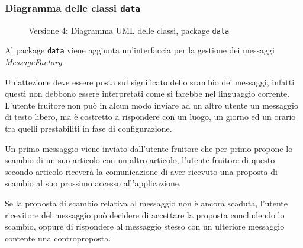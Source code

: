 \subsubsection{Diagramma delle classi \texttt{data}}
\vspace{0.5cm}
\begin{figure}[H]
    \centering
    \caption{Versione 4: Diagramma UML delle classi, package \texttt{data}}
    \label{fig:class_data_v_4}
\end{figure}

Al package \texttt{data} viene aggiunta un'interfaccia per la gestione dei messaggi \textit{MessageFactory}.

Un'attezione deve essere posta sul significato dello scambio dei messaggi, infatti questi non debbono essere interpretati come si farebbe
nel linguaggio corrente. L'utente fruitore non può in alcun modo inviare ad un altro utente un messaggio di testo libero, ma è costretto
a rispondere con un luogo, un giorno ed un orario tra quelli prestabiliti in fase di configurazione.

Un primo messaggio viene inviato dall'utente fruitore che per primo propone lo scambio di un suo articolo con un altro articolo,
l'utente fruitore di questo secondo articolo riceverà la comunicazione di aver ricevuto una proposta di scambio al suo prossimo accesso all'applicazione.

Se la proposta di scambio relativa al messaggio non è ancora scaduta, l'utente ricevitore del messaggio può decidere di accettare la proposta concludendo lo scambio,
oppure di rispondere al messaggio stesso con un ulteriore messaggio contente una controproposta.